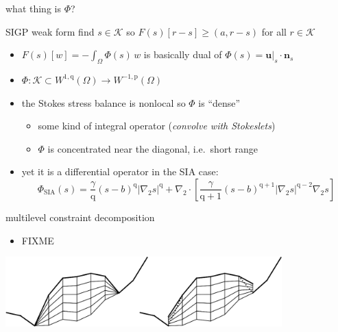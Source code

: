 \documentclass[usepdftitle=false]{beamer}
\newcommand{\grad}{\nabla}
\newcommand{\bn}{\mathbf{n}}
\newcommand{\bu}{\mathbf{u}}
\newcommand{\ip}[2]{\left(#1,#2\right)}
\newcommand{\pp}{{\text{p}}}
\newcommand{\qq}{{\text{q}}}
\newcommand{\bus}{\bu|_s}
\begin{document}
\begin{frame}{what thing is $\Phi$?}

\begin{block}{SIGP weak form}
find $s \in \mathcal{K}$ so $F(s)[r - s] \ge \ip{a}{r-s}$ for all $r \in \mathcal{K}$
\end{block}

\begin{itemize}
\item $F(s)[w] = - \int_\Omega \Phi(s)\, w$ is basically dual of $\Phi(s)=\bus\cdot\bn_s$
\item $\Phi : \mathcal{K} \subset W^{1,\qq}(\Omega) \to W^{-1,\pp}(\Omega)$
\item the Stokes stress balance is nonlocal so $\Phi$ is ``dense''
    \begin{itemize}
    \item some kind of integral operator (\emph{convolve with Stokeslets})
    \item $\Phi$ is concentrated near the diagonal, i.e.~short range
    \end{itemize}
\item yet it is a differential operator in the SIA case:
\small
    $$\Phi_{\text{SIA}}(s) = \frac{\gamma}{\qq} (s-b)^{\qq} |\grad_2 s|^{\qq} + \grad_2 \cdot\left[\frac{\gamma}{\qq+1} (s-b)^{\qq+1} |\grad_2 s|^{\qq-2} \grad_2 s\right]$$
\normalsize
\end{itemize}
\end{frame}


\begin{frame}{multilevel constraint decomposition}

\begin{itemize}
\item FIXME \cite{BuelerMitchell2022}
\end{itemize}

\includegraphics[width=0.8\textwidth]{figs/extruded.png}


\end{frame}


\end{document}
